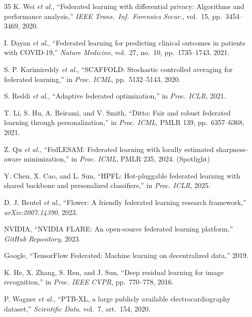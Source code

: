 \documentclass[conference]{IEEEtran}
\begin{document}
\begin{thebibliography}{35}
K. Wei \textit{et al.}, ``Federated learning with differential privacy: Algorithms and performance analysis,'' \textit{IEEE Trans.~Inf.~Forensics Secur.}, vol.~15, pp.~3454--3469, 2020.

I. Dayan \textit{et al.}, ``Federated learning for predicting clinical outcomes in patients with COVID-19,'' \textit{Nature Medicine}, vol.~27, no.~10, pp.~1735--1743, 2021.

S. P. Karimireddy \textit{et al.}, ``SCAFFOLD: Stochastic controlled averaging for federated learning,'' in \textit{Proc. ICML}, pp.~5132--5143, 2020.

S. Reddi \textit{et al.}, ``Adaptive federated optimization,'' in \textit{Proc. ICLR}, 2021.

T. Li, S. Hu, A. Beirami, and V. Smith, ``Ditto: Fair and robust federated learning through personalization,'' in \textit{Proc. ICML}, PMLR 139, pp.~6357--6368, 2021.

Z. Qu \textit{et al.}, ``FedLESAM: Federated learning with locally estimated sharpness-aware minimization,'' in \textit{Proc. ICML}, PMLR 235, 2024. (Spotlight)

Y. Chen, X. Cao, and L. Sun, ``HPFL: Hot-pluggable federated learning with shared backbone and personalized classifiers,'' in \textit{Proc. ICLR}, 2025.

D. J. Beutel \textit{et al.}, ``Flower: A friendly federated learning research framework,'' \textit{arXiv:2007.14390}, 2023.

NVIDIA, ``NVIDIA FLARE: An open-source federated learning platform,'' \textit{GitHub Repository}, 2023.

Google, ``TensorFlow Federated: Machine learning on decentralized data,'' 2019.

K. He, X. Zhang, S. Ren, and J. Sun, ``Deep residual learning for image recognition,'' in \textit{Proc. IEEE CVPR}, pp.~770--778, 2016.

P. Wagner \textit{et al.}, ``PTB-XL, a large publicly available electrocardiography dataset,'' \textit{Scientific Data}, vol.~7, art.~154, 2020.

\end{thebibliography}
\end{document}
